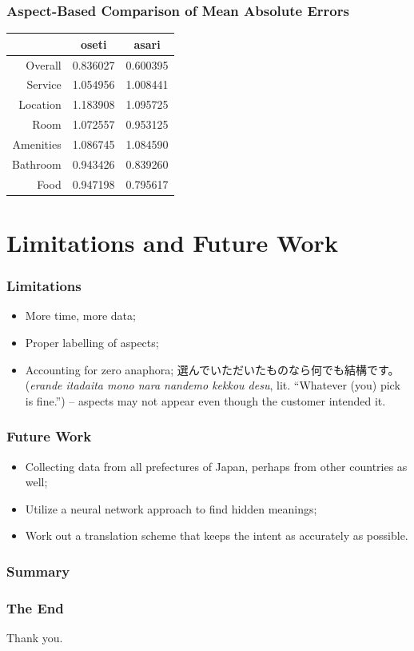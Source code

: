 \documentclass[11pt]{beamer}
\begin{document}
	\begin{frame}
		\frametitle{Aspect-Based Comparison of Mean Absolute Errors}
		\begin{table}
			\begin{center}
				{\renewcommand{\arraystretch}{1.5}
					\renewcommand{\tabcolsep}{0.2cm}
					\begin{tabular}{|r|c|c|}
						\hline
						& oseti & asari\\
						\hline
						Overall & 0.836027 & 0.600395\\
						\hline
						Service & 1.054956 & 1.008441\\
						\hline
						Location & 1.183908 & 1.095725\\
						\hline
						Room & 1.072557 & 0.953125\\
						\hline
						Amenities & 1.086745 & 1.084590\\
						\hline
						Bathroom & 0.943426 & 0.839260\\
						\hline
						Food & 0.947198 & 0.795617\\
						\hline
				\end{tabular}}
			\end{center}
		\end{table}
	\end{frame}
	
	\section{Limitations and Future Work}
	
	\begin{frame}
		\frametitle{Limitations}
		\begin{itemize}
			\item More time, more data;
			\pause
			\item Proper labelling of aspects;
			\pause
			\item Accounting for zero anaphora; 選んでいただいたものなら何でも結構です。 (\textit{erande itadaita mono nara nandemo kekkou desu}, lit. ``Whatever (you) pick is fine.'') -- aspects may not appear even though the customer intended it.
		\end{itemize}
	\end{frame}
	
	\begin{frame}
		\frametitle{Future Work}
		\begin{itemize}
			\item Collecting data from all prefectures of Japan, perhaps from other countries as well;
			\pause
			\item Utilize a neural network approach to find hidden meanings;
			\pause
			\item Work out a translation scheme that keeps the intent as accurately as possible.
		\end{itemize}
	\end{frame}
	
	\begin{frame}
		\frametitle{Summary}
		\tableofcontents
	\end{frame}
	
	\begin{frame}
		\frametitle{The End}
		Thank you.
	\end{frame}
	
\end{document}

